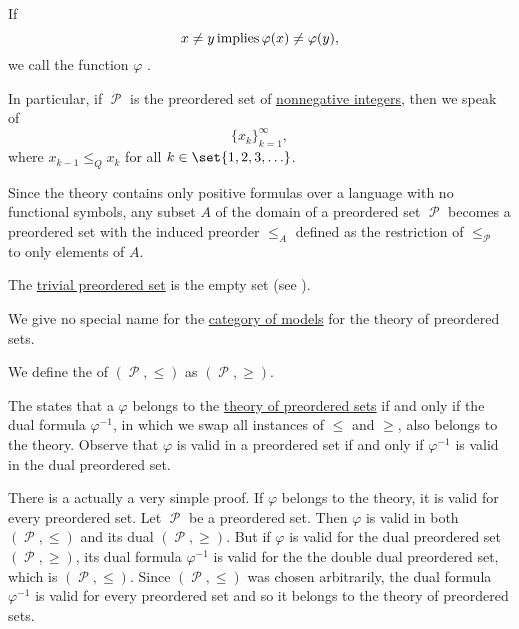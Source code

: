 \begin{definition}
\begin{thmenum}[series=def:preordered_set]
    If
    \begin{equation*}
      x \neq y \T{implies} \varphi(x) \neq \varphi(y),
    \end{equation*}
    we call the function \( \varphi \) .

    In particular, if \( \mscrP \) is the preordered set of \hyperref[rem:peano_arithmetic_zero/nonnegative]{nonnegative integers}, then we speak of 
    \begin{equation*}
      \{ x_k \}_{k=1}^\infty,
    \end{equation*}
    where \( x_{k-1} \leq_Q x_k \) for all \( k \in \set{ 1, 2, 3, \ldots } \).

     Since the theory contains only positive formulas over a language with no functional symbols, any subset \( A \) of the domain of a preordered set \( \mscrP \) becomes a preordered set with the induced preorder \( \leq_A \) defined as the restriction of \( \leq_\mscrP \) to only elements of \( A \).

     The \hyperref[thm:substructures_form_complete_lattice/bottom]{trivial preordered set} is the empty set (see ).

     We give no special name for the \hyperref[def:category_of_first_order_models]{category of models} for the theory of preordered sets.

     We define the  of \( (\mscrP, \leq) \) as \( (\mscrP, \geq) \).

    The  states that a \( \varphi \) belongs to the \hyperref[def:preordered_set/theory]{theory of preordered sets} if and only if the dual formula \( \varphi^{-1} \), in which we swap all instances of \( \leq \) and \( \geq \), also belongs to the theory. Observe that \( \varphi \) is valid in a preordered set if and only if \( \varphi^{-1} \) is valid in the dual preordered set.

    There is a actually a very simple proof. If \( \varphi \) belongs to the theory, it is valid for every preordered set. Let \( \mscrP \) be a preordered set. Then \( \varphi \) is valid in both \( (\mscrP, \leq) \) and its dual \( (\mscrP, \geq) \). But if \( \varphi \) is valid for the dual preordered set \( (\mscrP, \geq) \), its dual formula \( \varphi^{-1} \) is valid for the the double dual preordered set, which is \( (\mscrP, \leq) \). Since \( (\mscrP, \leq) \) was chosen arbitrarily, the dual formula \( \varphi^{-1} \) is valid for every preordered set and so it belongs to the theory of preordered sets.


\end{thmenum}
\end{definition}
